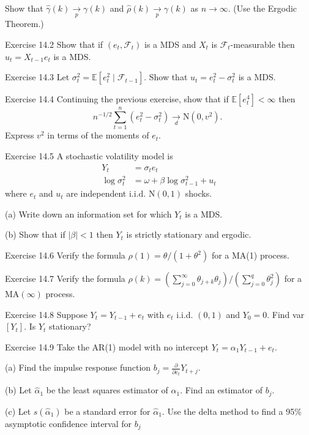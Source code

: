 \documentclass[10pt]{article}
\begin{document}
Show that $\widehat{\gamma}(k) \underset{p}{\longrightarrow} \gamma(k)$ and $\widehat{\rho}(k) \underset{p}{\longrightarrow} \gamma(k)$ as $n \rightarrow \infty$. (Use the Ergodic Theorem.)

Exercise 14.2 Show that if $\left(e_{t}, \mathscr{F}_{t}\right)$ is a MDS and $X_{t}$ is $\mathscr{F}_{t}$-measurable then $u_{t}=X_{t-1} e_{t}$ is a MDS.

Exercise 14.3 Let $\sigma_{t}^{2}=\mathbb{E}\left[e_{t}^{2} \mid \mathscr{F}_{t-1}\right]$. Show that $u_{t}=e_{t}^{2}-\sigma_{t}^{2}$ is a MDS.

Exercise 14.4 Continuing the previous exercise, show that if $\mathbb{E}\left[e_{t}^{4}\right]<\infty$ then
$$
n^{-1 / 2} \sum_{t=1}^{n}\left(e_{t}^{2}-\sigma_{t}^{2}\right) \underset{d}{\longrightarrow} \mathrm{N}\left(0, v^{2}\right) \text {. }
$$
Express $v^{2}$ in terms of the moments of $e_{t}$.

Exercise 14.5 A stochastic volatility model is
$$
\begin{aligned}
Y_{t} &=\sigma_{t} e_{t} \\
\log \sigma_{t}^{2} &=\omega+\beta \log \sigma_{t-1}^{2}+u_{t}
\end{aligned}
$$
where $e_{t}$ and $u_{t}$ are independent i.i.d. $\mathrm{N}(0,1)$ shocks.

(a) Write down an information set for which $Y_{t}$ is a MDS.

(b) Show that if $|\beta|<1$ then $Y_{t}$ is strictly stationary and ergodic.

Exercise 14.6 Verify the formula $\rho(1)=\theta /\left(1+\theta^{2}\right)$ for a MA(1) process.

Exercise 14.7 Verify the formula $\rho(k)=\left(\sum_{j=0}^{\infty} \theta_{j+k} \theta_{j}\right) /\left(\sum_{j=0}^{q} \theta_{j}^{2}\right)$ for a $\mathrm{MA}(\infty)$ process.

Exercise 14.8 Suppose $Y_{t}=Y_{t-1}+e_{t}$ with $e_{t}$ i.i.d. $(0,1)$ and $Y_{0}=0$. Find var $\left[Y_{t}\right]$. Is $Y_{t}$ stationary?

Exercise 14.9 Take the AR(1) model with no intercept $Y_{t}=\alpha_{1} Y_{t-1}+e_{t}$.

(a) Find the impulse response function $b_{j}=\frac{\partial}{\partial e_{t}} Y_{t+j}$.

(b) Let $\widehat{\alpha}_{1}$ be the least squares estimator of $\alpha_{1}$. Find an estimator of $b_{j}$.

(c) Let $s\left(\widehat{\alpha}_{1}\right)$ be a standard error for $\widehat{\alpha}_{1}$. Use the delta method to find a 95\% asymptotic confidence interval for $b_{j}$
\end{document}
